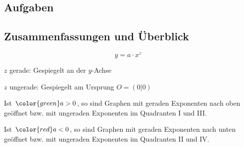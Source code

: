 \subsection*{Aufgaben}
\newpage

\subsection{Zusammenfassungen und
  Überblick}

$$y = a\cdot{}x^z$$

$z$ gerade: Gespiegelt an der $y$-Achse

$z$ ungerade: Gespiegelt am Ursprung $O=(0|0)$

Ist ${\color{green}a>0}$, so sind Graphen mit
geraden Exponenten nach oben geöffnet bzw. mit ungeraden Exponenten im
Quadranten I und III.

Ist ${\color{red}a<0}$, so sind Graphen mit
geraden Exponenten nach unten geöffnet bzw. mit ungeraden Exponenten
im Quadranten II und IV.

\newpage
